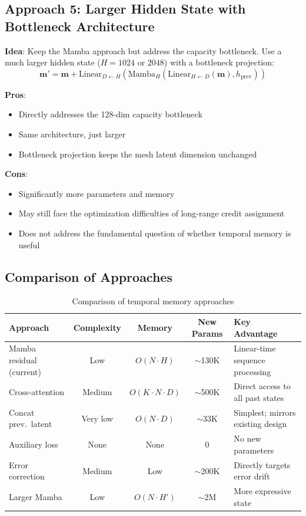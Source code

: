 \documentclass[11pt,a4paper]{article}
\begin{document}
\subsection{Approach 5: Larger Hidden State with Bottleneck Architecture}

\textbf{Idea}: Keep the Mamba approach but address the capacity bottleneck. Use a much larger hidden state ($H{=}1024$ or $2048$) with a bottleneck projection:
\[
\mathbf{m}' = \mathbf{m} + \text{Linear}_{D \leftarrow H}(\text{Mamba}_{H}(\text{Linear}_{H \leftarrow D}(\mathbf{m}), h_\text{prev}))
\]

\textbf{Pros}:
\begin{itemize}[nosep]
  \item Directly addresses the 128-dim capacity bottleneck
  \item Same architecture, just larger
  \item Bottleneck projection keeps the mesh latent dimension unchanged
\end{itemize}

\textbf{Cons}:
\begin{itemize}[nosep]
  \item Significantly more parameters and memory
  \item May still face the optimization difficulties of long-range credit assignment
  \item Does not address the fundamental question of whether temporal memory is useful
\end{itemize}

\subsection{Comparison of Approaches}

\begin{table}[H]
\centering
\caption{Comparison of temporal memory approaches}
\small
\begin{tabular}{p{3.5cm}cccp{3.5cm}}
\toprule
Approach & Complexity & Memory & New Params & Key Advantage \\
\midrule
Mamba residual (current) & Low & $O(N \cdot H)$ & $\sim$130K & Linear-time sequence processing \\
Cross-attention & Medium & $O(K \cdot N \cdot D)$ & $\sim$500K & Direct access to all past states \\
Concat prev.\ latent & Very low & $O(N \cdot D)$ & $\sim$33K & Simplest; mirrors existing design \\
Auxiliary loss & None & None & 0 & No new parameters \\
Error correction & Medium & Low & $\sim$200K & Directly targets error drift \\
Larger Mamba & Low & $O(N \cdot H')$ & $\sim$2M & More expressive state \\
\bottomrule
\end{tabular}
\end{table}
\end{document}
